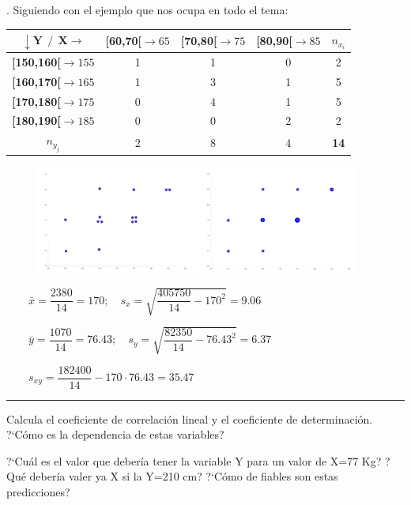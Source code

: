 \begin{example}
.	Siguiendo con el ejemplo que nos ocupa en todo el tema:

	\begin{table}[H]
\centering
\begin{tabular}{c|c|c|c|c}
$\boldsymbol{\downarrow Y \ \ / \ \ X \rightarrow}$ & \textbf{{[}60,70{[}$\to 65$} & \textbf{{[}70,80{[}$\to 75$} & \textbf{{[}80,90{[}$\to 85$} & \textbf{$n_{x_i}$} \\ \hline
\textbf{{[}150,160{[}$\to 155$} & 1 & 1 & 0 & 2 \\ \hline
\textbf{{[}160,170{[}$\to 165$} & 1 & 3 & 1 & 5 \\ \hline
\textbf{{[}170,180{[}$\to 175$} & 0 & 4 & 1 & 5 \\ \hline
\textbf{{[}180,190{[}$\to 185$} & 0 & 0 & 2 & 2 \\ \hline
\textbf{$n_{y_j}$} & 2 & 8 & 4 & \textbf{14}
\end{tabular}
\end{table}


	\begin{figure}[H]
			\centering
			\includegraphics[width=0.95\textwidth]{imagenes/imagenes03/T03IM02.png}
	\end{figure}

$\qquad \bar x=\dfrac{2380}{14}=170;$$\quad$$s_x=\sqrt{\dfrac{405750}{14}-170^2}=9.06$

$\qquad \bar y=\dfrac{1070}{14}=76.43;$$\quad$$s_y=\sqrt{\dfrac{82350}{14}-76.43^2}=6.37$

$\qquad s_{xy}=\dfrac{182400}{14}-170\cdot 76.43=35.47$

\textcolor{green}{\rule{100mm}{0.1mm}}
	
\vspace{3mm} %
Calcula el coeficiente de correlación lineal y el coeficiente de determinación. ?`Cómo es la dependencia de estas variables?

?`Cuál es el valor que debería tener la variable Y para un valor de X=77 Kg? ?Qué debería valer ya X si la Y=210 cm? ?`Cómo de fiables son estas predicciones?


\end{example}
